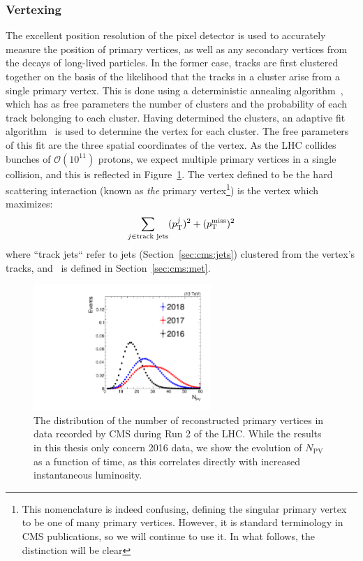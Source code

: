 \subsubsection{Vertexing}

The excellent position resolution of the pixel detector is used to accurately measure the position of primary vertices, as well as any secondary vertices from the decays of long-lived particles.
In the former case, tracks are first clustered together on the basis of the likelihood that the tracks in a cluster arise from a single primary vertex.
This is done using a deterministic annealing algorithm~\cite{da}, which has as free parameters the number of clusters and the probability of each track belonging to each cluster.
Having determined the clusters, an adaptive fit algorithm~\cite{adaptivefit} is used to determine the vertex for each cluster.
The free parameters of this fit are the three spatial coordinates of the vertex.
As the LHC collides bunches of $\mathcal{O}(10^{11})$ protons, we expect multiple primary vertices in a single collision, and this is reflected in Figure~\ref{fig:cms:npv}.
The vertex defined to be the hard scattering interaction (known as \emph{the} primary vertex\footnote{This nomenclature is indeed confusing, defining the singular primary vertex to be one of many primary vertices. However, it is standard terminology in CMS publications, so we will continue to use it. In what follows, the distinction will be clear}) is the vertex which maximizes:
\begin{equation}
	\sum_{j\in\text{track jets}} (p_\mathrm{T}^j)^2 + (p_\mathrm{T}^\mathrm{miss})^2
\end{equation}
where ``track jets`` refer to jets (Section~\ref{sec:cms:jets}) clustered from the vertex's tracks, and \ptmiss~is defined in Section~\ref{sec:cms:met}.

\begin{figure}[]
    \begin{center} 
        \includegraphics[width=0.6\textwidth]{figures/cms/comparison_npv.pdf}
        \caption{The distribution of the number of reconstructed primary vertices in data recorded by CMS during Run 2 of the LHC.
				 While the results in this thesis only concern 2016 data, we show the evolution of $N_\mathrm{PV}$ as a function of time, as this correlates directly with increased instantaneous luminosity.}
        \label{fig:cms:npv}
    \end{center}
\end{figure}

